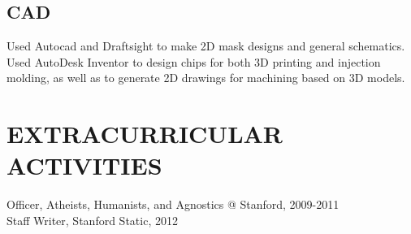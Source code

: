 \documentclass{res}
\begin{document}
\begin{resume}
 	\subsection{CAD}
 	Used Autocad and Draftsight to make 2D mask designs and general schematics.\\
 	Used AutoDesk Inventor to design chips for both 3D printing and injection molding,
 	as well as to generate 2D drawings for machining based on 3D models.

 \section{EXTRACURRICULAR ACTIVITIES}
     Officer, Atheists, Humanists, and Agnostics @ Stanford, 2009-2011\\
     Staff Writer, Stanford Static, 2012\\

\end{resume}
\end{document}
